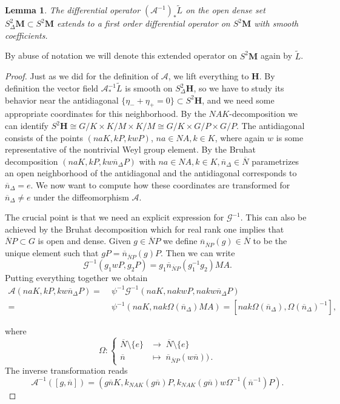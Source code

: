 \documentclass[10pt]{amsart}
\newtheorem{lemm}[cdrthm]{Lemma}
\theoremstyle{definition}
\newcommand{\mc}{\mathcal}
\newcommand{\til}{\widetilde}
\newcommand{\bn}{{\overline{n}}}
\newcommand{\bN}{{\overline{N}}}
\newcommand{\hspc}{\mathbf{H}}
\begin{document}
\begin{lemm}\label{lem:smooth_extension}
The differential operator $(\mathcal A^{-1})_*\til L$ on the open dense set $S^2_\Delta\mathbf M\subset S^2\mathbf M$ extends to a first order differential operator on $S^2\mathbf M$ with smooth coefficients.
\end{lemm}

By abuse of notation we will denote this extended operator on $S^2\mathbf M$ again by $\til L$.

\begin{proof}
Just as we did for the definition of $\mc{A}$, we lift everything to $\hspc$. By definition the vector field $\mathcal A^{-1}_*\til L$ is smooth on $S^2_\Delta \hspc$, so we have to study its behavior near the antidiagonal $\{\eta_-+\eta_+=0\}\subset S^2\hspc$, and we need some appropriate coordinates for this neighborhood. By the $NAK$-decomposition we can identify $S^2\hspc \cong G/K\times K/M\times K/M \cong G/K\times G/P\times G/P $. The antidiagonal consists of the points $(naK, kP, kwP)$, $na\in NA, k\in K$, where again $w$ is some representative of the nontrivial Weyl group element. By the Bruhat decomposition $(naK, kP, kw\bn_\Delta P)$ with $na\in NA, k\in K, \bn_\Delta\in\bN$ parametrizes an open neighborhood of the antidiagonal and the antidiagonal corresponds to $\bn_\Delta=e$. We now want to compute how these coordinates are transformed for $\bn_\Delta \neq e$ under the diffeomorphism $\mathcal A$.

The crucial point is that we need an explicit expression for $\mathcal G^{-1}$. This can also be achieved by the Bruhat decomposition which for real rank one implies that $\bN P \subset G$ is open and dense. Given $g\in\bN P$ we define $\overline{n}_{\bN P}(g)\in\bN$ to be the unique element such that $gP = \overline{n}_{\bN P}(g)P$. Then we can write
\[
\mathcal G^{-1}(g_1wP, g_2P) = g_1\overline{n}_{\bN P}\left(g_1^{-1}g_2\right)MA.
\]
Putting everything together we obtain
\begin{align*}
\mathcal A\left(naK, kP, kw\bn_\Delta P\right) =\;&
\psi^{-1}\mc{G}^{-1}\left(naK,nakwP,nakw\bn_{\Delta}P\right)\\
=\;& \psi^{-1}\left(naK, nak\Omega(\bn_{\Delta})MA\right) = \left[nak\Omega(\bn_\Delta),
\Omega(\bn_\Delta)^{-1}\right],
\end{align*}

where
\[
\Omega:
\begin{cases}
\bN\setminus\{e\} &\rightarrow\;\bN\setminus\{e\}\\
\bn &\mapsto\;\overline{n}_{\bN P}(w\bn))\,.
\end{cases}
\]
The inverse transformation reads
\begin{equation}\label{eq:pairing_A_inv}
\mathcal A^{-1}([g, \bn]) = \left(g\bn K, k_{NAK}(g\bn) P, k_{NAK}(g\bn)w
\Omega^{-1}\left(\bn^{-1}\right)P\right).
\end{equation}


\end{proof}
\end{document}
